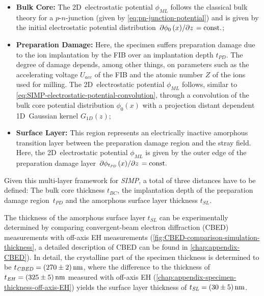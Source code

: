 \begin{itemize}
	\item \textbf{Bulk Core:} The 2D~electrostatic potential $\phi_{\mathit{ML}}$ follows the classical bulk theory for a $p$-$n$-junction (given by \cref{eq:pn-junction-potential}) and is given by the initial electrostatic potential distribution $\pdv*{\phi_0\left(x\right)}{z} = \text{const.}$;
	\item \textbf{Preparation Damage:} Here, the specimen suffers preparation damage due to the ion implantation by the FIB over an implantation depth $t_{\mathit{PD}}$. The degree of damage depends, among other things, on parameters such as the accelerating voltage $U_{\mathit{acc}}$ of the FIB and the atomic number $Z$ of the ions used for milling. The 2D~electrostatic potential $\phi_{\mathit{ML}}$ follows, similar to \cref{eq:SIMP-electrostatic-potential-convolution}, through a convolution of the bulk core potential distribution $\phi_0\left(x\right)$ with a projection distant dependent 1D~Gaussian kernel $G_{\mathit{1D}}\left(z\right)$;
	\item \textbf{Surface Layer:} This region represents an electrically inactive amorphous transition layer between the preparation damage region and the stray field. Here, the 2D~electrostatic potential $\phi_{\mathit{ML}}$ is given by the outer edge of the preparation damage layer $\pdv*{\phi_{t_{\mathit{PD}}}\left(x\right)}{z} = \text{const.}$
\end{itemize}
Given this multi-layer framework for \emph{SIMP}, a total of three distances have to be defined: The bulk core thickness $t_{\mathit{BC}}$, the implantation depth of the preparation damage region~$t_{\mathit{PD}}$ and the amorphous surface layer thickness $t_{\mathit{SL}}$.

The thickness of the amorphous surface layer $t_{\mathit{SL}}$ can be experimentally determined by comparing convergent-beam electron diffraction (CBED) measurements with off-axis EH measurements (\cref{fig:CBED-comparison-simulation-thickness}, a detailed description of CBED can be found in \cref{chap:appendix-CBED}). In detail, the crystalline part of the specimen thickness is determined to be $t_{\mathit{CBED}} = \SI{270 \pm 2}{\nm}$, where the difference to the thickness of $t_{\mathit{EH}} = \SI{325 \pm 5}{\nm}$ measured with off-axis EH (\cref{chap:appendix-specimen-thickness-off-axis-EH}) yields the surface layer thickness of $t_{\mathit{SL}} = \SI{30 \pm 5}{\nm}$.

